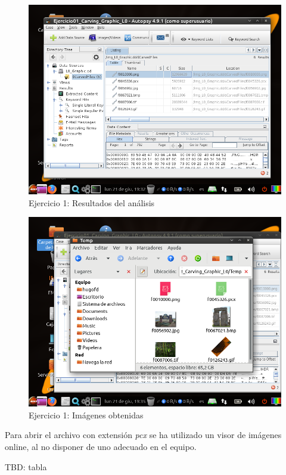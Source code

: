 \documentclass[11pt]{article}
\begin{document}
\begin{figure}[H]
  \caption{Ejercicio 1: Resultados del análisis}
  \centering
  \includegraphics[scale=0.7]{e1-5.png}
\end{figure}

\begin{figure}[H]
  \caption{Ejercicio 1: Imágenes obtenidas}
  \centering
  \includegraphics[scale=0.7]{e1-6.png}
\end{figure}

Para abrir el archivo con extensión \textit{pcx} se ha utilizado un visor de imágenes online, al no disponer de uno adecuado en el equipo.

TBD: tabla

\end{document}
